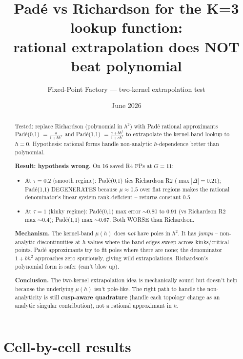 \documentclass[11pt]{article}
\title{Pad\'e vs Richardson for the K=3 lookup function:\\
       rational extrapolation does NOT beat polynomial}
\author{Fixed-Point Factory --- two-kernel extrapolation test}
\date{June 2026}
\begin{document}
\maketitle

\begin{abstract}
\noindent
Tested: replace Richardson (polynomial in $h^2$) with Pad\'e rational
approximants Pad\'e(0,1) $=\frac{a}{1+b h^2}$ and Pad\'e(1,1)
$=\frac{a + b h^2}{1 + c h^2}$ to extrapolate the kernel-band lookup
to $h{=}0$. Hypothesis: rational forms handle non-analytic $h$-dependence
better than polynomial.

\textbf{Result: hypothesis wrong.} On 16 saved R4 FPs at $G{=}11$:

\begin{itemize}
  \item At $\tau{=}0.2$ (smooth regime): Pad\'e(0,1) ties Richardson R2
        ($\max|\Delta|=0.21$); Pad\'e(1,1) DEGENERATES because
        $\mu \approx 0.5$ over flat regions makes the rational
        denominator's linear system rank-deficient -- returns
        constant 0.5.
  \item At $\tau{=}1$ (kinky regime): Pad\'e(0,1) max error
        $\sim 0.80$ to $0.91$ (vs Richardson R2 max $\sim 0.4$);
        Pad\'e(1,1) max $\sim 0.67$. Both WORSE than Richardson.
\end{itemize}

\textbf{Mechanism.} The kernel-band $\mu(h)$ does \emph{not} have poles
in $h^2$. It has \emph{jumps} -- non-analytic discontinuities at $h$ values
where the band edges sweep across kinks/critical points. Pad\'e
approximants try to fit poles where there are none; the denominator
$1 + b h^2$ approaches zero spuriously, giving wild extrapolations.
Richardson's polynomial form is safer (can't blow up).

\textbf{Conclusion.} The two-kernel extrapolation idea is mechanically
sound but doesn't help because the underlying $\mu(h)$ isn't pole-like.
The right path to handle the non-analyticity is still
\textbf{cusp-aware quadrature} (handle each topology change as an
analytic singular contribution), not a rational approximant in $h$.
\end{abstract}

\section{Cell-by-cell results}
\end{document}
